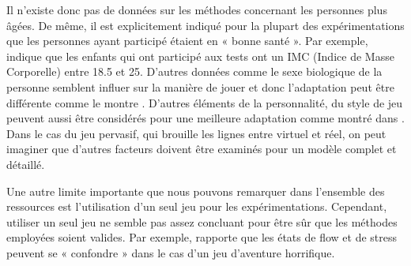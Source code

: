 \documentclass{article}
\begin{document}
    Il n’existe donc pas de données sur les méthodes concernant les personnes plus âgées. 
    De même, il est explicitement indiqué pour la plupart des expérimentations que les personnes ayant participé étaient en « bonne santé ». 
    Par exemple, \cite{yannakakis_et_al._2009} indique que les enfants qui ont participé aux tests ont un IMC (Indice de Masse Corporelle) entre 18.5 et 25. 
    D’autres données comme le sexe biologique de la personne semblent influer sur la manière de jouer et donc l’adaptation peut être différente comme le montre \cite{carofiglio_et_al._2019}. D’autres éléments de la personnalité, du style de jeu peuvent aussi être considérés pour une meilleure adaptation comme montré dans \cite{Mostefai_et_al._2019}. 
    Dans le cas du jeu pervasif, qui brouille les lignes entre virtuel et réel, on peut imaginer que d’autres facteurs doivent être examinés pour un modèle complet et détaillé.\par
    Une autre limite importante que nous pouvons remarquer dans l’ensemble des ressources est l’utilisation d’un seul jeu pour les expérimentations. 
    Cependant, utiliser un seul jeu ne semble pas assez concluant pour être sûr que les méthodes employées soient valides. Par exemple, \cite{carofiglio_et_al._2019} rapporte que les états de flow et de stress peuvent se « confondre » dans le cas d’un jeu d’aventure horrifique.
    
\end{document}
